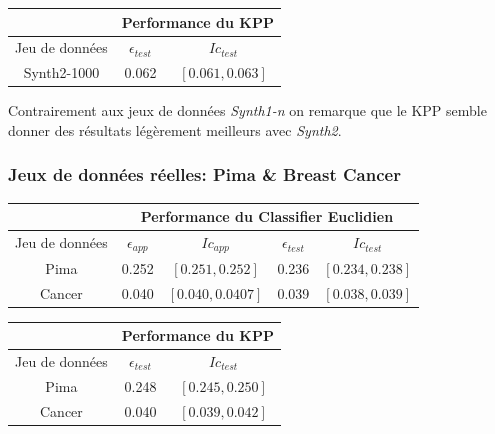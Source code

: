 \documentclass[10pt]{article}
\begin{document}
		
		\begin{center}		
			\begin{tabular}{ | c | c | c |}
				\rowcolor{lightgray} 
				&  \multicolumn{2}{|c|}{Performance du KPP}\\
				
				\hline
				Jeu de données &   $\epsilon_{test}$ &  $Ic_{test}$\\
				\hline
				\multirow{1}{*}{Synth2-1000}       &0.062   & $[ 0.061, 0.063]$ 			 \\
				\hline
			\end{tabular}
		\end{center}
				Contrairement aux jeux de données \textit{Synth1-n} on remarque que le KPP semble donner des résultats légèrement meilleurs avec \textit{Synth2}.
				\subsubsection{ Jeux de données réelles: Pima \& Breast Cancer}
				
			
				
				
				\begin{center}		
				\begin{tabular}{ | c | c | c || c | c |}
					\rowcolor{lightgray} 
					&  \multicolumn{4}{c||}{ Performance du Classifier Euclidien}  \\
					\hline
					Jeu de données &   $\epsilon_{app}$ & $Ic_{app}$ & $\epsilon_{test}$ & $Ic_{test}$\\
					\hline
					\multirow{1}{*}{Pima}     &     0.252   & $[0.251, 0.252]$		&0.236     &		$[0.234, 0.238 ]$	 \\
					\hline
					\multirow{1}{*}{Cancer}     &    0.040   & $[0.040, 0.0407]$& 0.039    &		$[0.038, 0.039]$	 \\
					\hline
					
				\end{tabular}
			\end{center}
				
				
					\begin{center}		
					\begin{tabular}{ | c | c | c |}
						\rowcolor{lightgray} 
						&  \multicolumn{2}{|c|}{Performance du KPP}\\
						
						\hline
						Jeu de données &   $\epsilon_{test}$ &  $Ic_{test}$\\
						\hline
						\multirow{1}{*}{Pima}       & 0.248 & $[0.245, 0.250]$ 			 \\
						\hline
							\multirow{1}{*}{Cancer}       &0.040    & $[0.039, 0.042]$ 			 \\
						\hline
					\end{tabular}
				\end{center}
				
\end{document}
